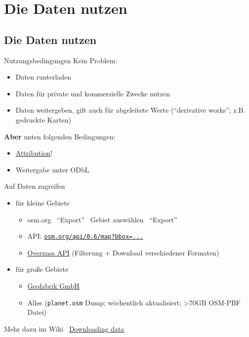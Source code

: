 \documentclass{beamer}
\begin{document}
	\section{Die Daten nutzen}
			
		\begin{frame}
		\tableofcontents[currentsection]
		\end{frame}
		
		\subsection{Die Daten nutzen}
			
			\begin{frame}{Nutzungsbedingungen}
				Kein Problem:
				\begin{itemize}
					\item Daten runterladen
					\item Daten für private und kommerzielle Zwecke nutzen
					\item Daten weitergeben, gilt auch für abgeleitete Werte (\enquote{derivative works}; z.B. gedruckte Karten)
				\end{itemize}
				\pause
				\textbf{Aber} unten folgenden Bedingungen:
				\begin{itemize}
					\item \href{https://osmfoundation.org/wiki/Licence/Attribution\_Guidelines}{Attribution}!
					\item Weitergabe unter ODbL
				\end{itemize}
			\end{frame}
			
			\begin{frame}{Auf Daten zugreifen}
				\begin{itemize}
					\item für kleine Gebiete
					\begin{itemize}
						\item osm.org \textrightarrow\ \enquote{Export} \textrightarrow\ Gebiet auswählen \textrightarrow\ \enquote{Export}
						\item API: \href{https://www.openstreetmap.org/api/0.6/map?bbox=9.93116,53.59846,9.93572,53.60052}{\texttt{osm.org/api/0.6/map?bbox=...}}
						\item \href{https://overpass-turbo.eu/}{Overpass API} (Filterung + Download verschiedener Formaten)
					\end{itemize}\pause
					\item für große Gebiete
					\begin{itemize}
						\item \href{https://download.geofabrik.de/}{Geofabrik GmbH}
						\item Alles (\texttt{planet.osm} Dump; wöchentlich aktualisiert; >70GB OSM-PBF Datei)
					\end{itemize}
				\end{itemize}
				\pause
				\vspace{0.25cm}
				Mehr dazu im Wiki \textrightarrow\ \href{https://wiki.openstreetmap.org/wiki/Downloading\_data}{Downloading data}
			\end{frame}
			
\end{document}
